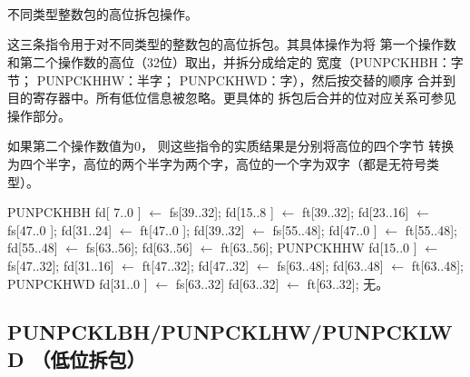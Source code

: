 \begin{instructionblk}
   \\
   \\
   \\
  {不同类型整数包的高位拆包操作。}
  {这三条指令用于对不同类型的整数包的高位拆包。其具体操作为将
  第一个操作数和第二个操作数的高位（32位）取出，并拆分成给定的
  宽度（PUNPCKHBH：字节； PUNPCKHHW：半字； PUNPCKHWD：字），然后按交替的顺序
  合并到目的寄存器中。所有低位信息被忽略。更具体的
  拆包后合并的位对应关系可参见操作部分。
  
  如果第二个操作数值为0， 则这些指令的实质结果是分别将高位的四个字节
  转换为四个半字，高位的两个半字为两个字，高位的一个字为双字（都是无符号类型）。}
  {PUNPCKHBH \narrownewline
  fd[ 7..0 ] $\leftarrow$ fs[39..32]; \narrownewline
  fd[15..8 ] $\leftarrow$ ft[39..32]; \narrownewline
  fd[23..16] $\leftarrow$ fs[47..0 ]; \narrownewline
  fd[31..24] $\leftarrow$ ft[47..0 ]; \narrownewline
  fd[39..32] $\leftarrow$ fs[55..48]; \narrownewline
  fd[47..0 ] $\leftarrow$ ft[55..48]; \narrownewline
  fd[55..48] $\leftarrow$ fs[63..56]; \narrownewline
  fd[63..56] $\leftarrow$ ft[63..56]; \narrownewline \narrownewline
  PUNPCKHHW \narrownewline
  fd[15..0 ] $\leftarrow$ fs[47..32]; \narrownewline
  fd[31..16] $\leftarrow$ ft[47..32]; \narrownewline
  fd[47..32] $\leftarrow$ fs[63..48]; \narrownewline
  fd[63..48] $\leftarrow$ ft[63..48]; \narrownewline \narrownewline
  PUNPCKHWD \narrownewline
  fd[31..0 ] $\leftarrow$ fs[63..32] \narrownewline
  fd[63..32] $\leftarrow$ ft[63..32];}
  {无。}
\end{instructionblk}

\subsection{PUNPCKLBH/PUNPCKLHW/PUNPCKLWD （低位拆包）}

